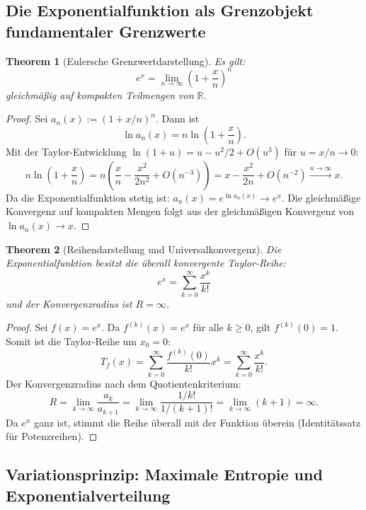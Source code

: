 ﻿\documentclass[12pt,a4paper]{article}
\newtheorem{theorem}{Theorem}[section]
\theoremstyle{definition}
\theoremstyle{remark}
\begin{document}
\subsection{Die Exponentialfunktion als Grenzobjekt fundamentaler Grenzwerte}

\begin{theorem}[Eulersche Grenzwertdarstellung]
\label{thm:euler_grenzwert}
Es gilt:
\begin{equation}
e^x = \lim_{n\to\infty}\left(1 + \frac{x}{n}\right)^n
\label{eq:euler_limes}
\end{equation}
gleichmäßig auf kompakten Teilmengen von $\mathbb{R}$.
\end{theorem}
\begin{proof}
Sei $a_n(x) := (1+x/n)^n$. Dann ist
\[
\ln a_n(x) = n\ln\!\left(1 + \frac{x}{n}\right).
\]
Mit der Taylor-Entwicklung $\ln(1+u) = u - u^2/2 + O(u^3)$ für $u = x/n \to 0$:
\[
n\ln\!\left(1 + \frac{x}{n}\right) = n\left(\frac{x}{n} - \frac{x^2}{2n^2} + O(n^{-3})\right) = x - \frac{x^2}{2n} + O(n^{-2}) \xrightarrow{n\to\infty} x.
\]
Da die Exponentialfunktion stetig ist: $a_n(x) = e^{\ln a_n(x)} \to e^x$. Die gleichmäßige Konvergenz auf kompakten Mengen folgt aus der gleichmäßigen Konvergenz von $\ln a_n(x) \to x$. 
\end{proof}

\begin{theorem}[Reihendarstellung und Universalkonvergenz]
\label{thm:reihe_exp}
Die Exponentialfunktion besitzt die überall konvergente Taylor-Reihe:
\begin{equation}
e^x = \sum_{k=0}^{\infty} \frac{x^k}{k!}
\end{equation}
und der Konvergenzradius ist $R = \infty$.
\end{theorem}
\begin{proof}
Sei $f(x) = e^x$. Da $f^{(k)}(x) = e^x$ für alle $k \geq 0$, gilt $f^{(k)}(0) = 1$. Somit ist die Taylor-Reihe um $x_0=0$:
\[
T_f(x) = \sum_{k=0}^\infty \frac{f^{(k)}(0)}{k!}x^k = \sum_{k=0}^\infty \frac{x^k}{k!}.
\]
Der Konvergenzradius nach dem Quotientenkriterium:
\[
R = \lim_{k\to\infty}\frac{a_k}{a_{k+1}} = \lim_{k\to\infty}\frac{1/k!}{1/(k+1)!} = \lim_{k\to\infty}(k+1) = \infty.
\]
Da $e^x$ ganz ist, stimmt die Reihe überall mit der Funktion überein (Identitätssatz für Potenzreihen). 
\end{proof}

\subsection{Variationsprinzip: Maximale Entropie und Exponentialverteilung}
\end{document}
